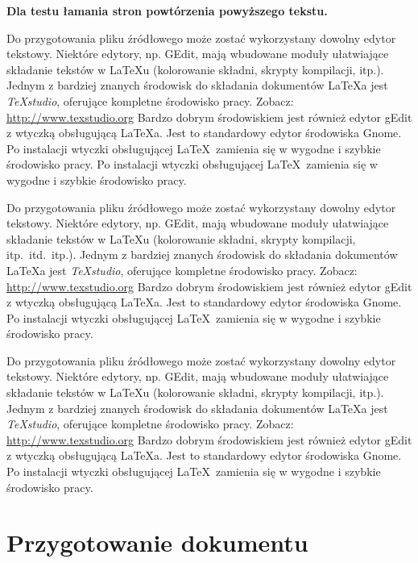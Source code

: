 \textbf{Dla testu łamania stron powtórzenia powyższego tekstu.}


Do przygotowania pliku źródłowego może zostać wykorzystany dowolny edytor tekstowy. Niektóre edytory, np. GEdit, mają wbudowane moduły ułatwiające składanie tekstów w LaTeXu (kolorowanie składni, skrypty kompilacji, itp.).
Jednym z bardziej znanych środowisk do składania dokumentów  \LaTeX a jest {\em TeXstudio}, oferujące kompletne środowisko pracy. Zobacz: \url{http://www.texstudio.org} %
Bardzo dobrym środowiskiem jest również edytor gEdit z wtyczką obsługującą \LaTeX a. Jest to standardowy edytor środowiska Gnome. Po instalacji wtyczki obsługującej \LaTeX\ zamienia się w wygodne i szybkie środowisko pracy. %
Po instalacji wtyczki obsługującej \LaTeX\ zamienia się w wygodne i szybkie środowisko pracy.

Do przygotowania pliku źródłowego może zostać wykorzystany dowolny edytor tekstowy. Niektóre edytory, np. GEdit, mają wbudowane moduły ułatwiające składanie tekstów w \LaTeX u (kolorowanie składni, skrypty kompilacji, itp.\ itd.\ itp.). %
Jednym z bardziej znanych środowisk do składania dokumentów  \LaTeX a jest {\em TeXstudio}, oferujące kompletne środowisko pracy. Zobacz: \url{http://www.texstudio.org} %
Bardzo dobrym środowiskiem jest również edytor gEdit z wtyczką obsługującą \LaTeX a. Jest to standardowy edytor środowiska Gnome. Po instalacji wtyczki obsługującej \LaTeX\ zamienia się w wygodne i szybkie środowisko pracy. %

Do przygotowania pliku źródłowego może zostać wykorzystany dowolny edytor tekstowy. Niektóre edytory, np. GEdit, mają wbudowane moduły ułatwiające składanie tekstów w LaTeXu (kolorowanie składni, skrypty kompilacji, itp.).
Jednym z bardziej znanych środowisk do składania dokumentów  \LaTeX a jest {\em TeXstudio}, oferujące kompletne środowisko pracy. Zobacz: \url{http://www.texstudio.org} %
Bardzo dobrym środowiskiem jest również edytor gEdit z wtyczką obsługującą \LaTeX a. Jest to standardowy edytor środowiska Gnome. Po instalacji wtyczki obsługującej \LaTeX\ zamienia się w wygodne i szybkie środowisko pracy. %


\section{Przygotowanie dokumentu}\label{sec:przygotowanieDokumentu}


